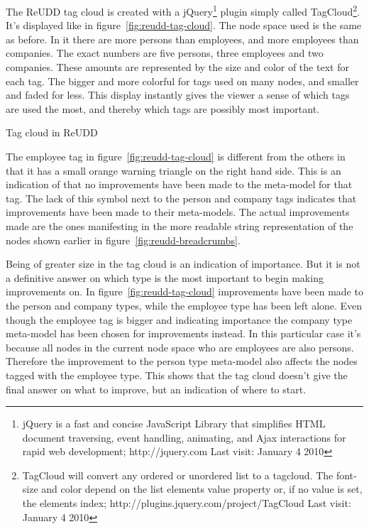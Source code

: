 \documentclass[a4paper]{report}
\begin{document}
The ReUDD tag cloud is created with a jQuery\footnote{jQuery is a fast and concise JavaScript Library that simplifies HTML document traversing, event handling, animating, and Ajax interactions for rapid web development; http://jquery.com Last visit: January 4 2010} plugin simply called TagCloud\footnote{TagCloud will convert any ordered or unordered list to a tagcloud. The font-size and color depend on the list elements value property or, if no value is set, the elements index; http://plugins.jquery.com/project/TagCloud Last visit: January 4 2010}. It's displayed like in figure~\ref{fig:reudd-tag-cloud}. The node space used is the same as before. In it there are more persons than employees, and more employees than companies. The exact numbers are five persons, three employees and two companies. These amounts are represented by the size and color of the text for each tag. The bigger and more colorful for tags used on many nodes, and smaller and faded for less. This display instantly gives the viewer a sense of which tags are used the most, and thereby which tags are possibly most important.

	{Tag cloud in ReUDD}

The employee tag in figure~\ref{fig:reudd-tag-cloud} is different from the others in that it has a small orange warning triangle on the right hand side. This is an indication of that no improvements have been made to the meta-model for that tag. The lack of this symbol next to the person and company tags indicates that improvements have been made to their meta-models. The actual improvements made are the ones manifesting in the more readable string representation of the nodes shown earlier in figure~\ref{fig:reudd-breadcrumbs}.

Being of greater size in the tag cloud is an indication of importance. But it is not a definitive answer on which type is the most important to begin making improvements on. In figure~\ref{fig:reudd-tag-cloud} improvements have been made to the person and company types, while the employee type has been left alone. Even though the employee tag is bigger and indicating importance the company type meta-model has been chosen for improvements instead. In this particular case it's because all nodes in the current node space who are employees are also persons. Therefore the improvement to the person type meta-model also affects the nodes tagged with the employee type. This shows that the tag cloud doesn't give the final answer on what to improve, but an indication of where to start.
\end{document}
